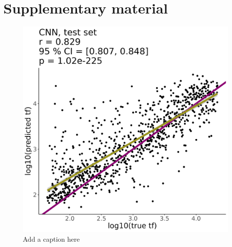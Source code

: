 \documentclass[12pt, letterpaper]{article}
\begin{document}
\section*{Supplementary material}

\begin{figure}[!h]
    \centering
    \includegraphics[width=0.5\linewidth]{figures/supplement/a_supplmental_figure.png}
    \caption{Add a caption here}
    \label{fig:enter-label}
\end{figure}
\end{document}
